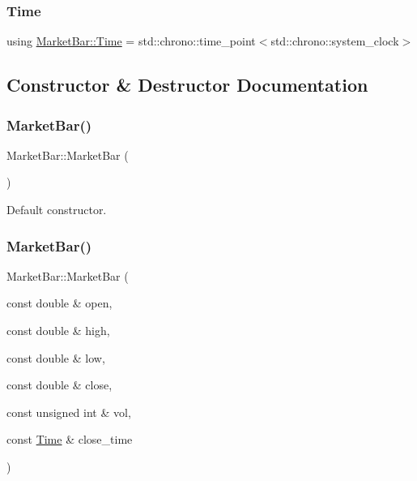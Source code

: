 \subsubsection{\texorpdfstring{Time}{Time}}
{\footnotesize\ttfamily using \hyperlink{classMarketBar_a0d7dabe1fd00e674ef72f54bb1ff9ad0}{Market\+Bar\+::\+Time} =  std\+::chrono\+::time\+\_\+point$<$std\+::chrono\+::system\+\_\+clock$>$}



\subsection{Constructor \& Destructor Documentation}
\mbox{\label{classMarketBar_a547a73fdfc07436f859da36efb4d8809}} 
\subsubsection{\texorpdfstring{Market\+Bar()}{MarketBar()}\hspace{0.1cm}{\footnotesize\ttfamily [1/3]}}
{\footnotesize\ttfamily Market\+Bar\+::\+Market\+Bar (\begin{DoxyParamCaption}{ }\end{DoxyParamCaption})\hspace{0.3cm}{\ttfamily [default]}}



Default constructor. 

\mbox{\label{classMarketBar_ad58b9bb40288a36f1cb9839ce120ea30}} 
\subsubsection{\texorpdfstring{Market\+Bar()}{MarketBar()}\hspace{0.1cm}{\footnotesize\ttfamily [2/3]}}
{\footnotesize\ttfamily Market\+Bar\+::\+Market\+Bar (\begin{DoxyParamCaption}\item[{const double \&}]{open,  }\item[{const double \&}]{high,  }\item[{const double \&}]{low,  }\item[{const double \&}]{close,  }\item[{const unsigned int \&}]{vol,  }\item[{const \hyperlink{classMarketBar_a0d7dabe1fd00e674ef72f54bb1ff9ad0}{Time} \&}]{close\+\_\+time }\end{DoxyParamCaption})}



